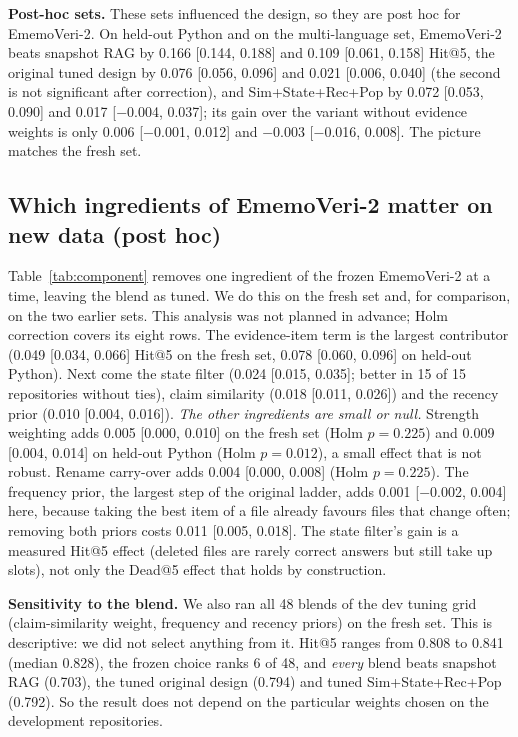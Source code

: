 \documentclass[runningheads]{llncs}
\newcommand{\sys}{EmemoVeri}
\begin{document}
\textbf{Post-hoc sets.} These sets influenced the design, so they are post hoc for \sys{}-2. On held-out Python and on the multi-language set, \sys{}-2 beats snapshot RAG by 0.166 [0.144, 0.188] and 0.109 [0.061, 0.158] Hit@5, the original tuned design by 0.076 [0.056, 0.096] and 0.021 [0.006, 0.040] (the second is not significant after correction), and Sim+State+Rec+Pop by 0.072 [0.053, 0.090] and 0.017 [$-$0.004, 0.037]; its gain over the variant without evidence weights is only 0.006 [$-$0.001, 0.012] and $-$0.003 [$-$0.016, 0.008]. The picture matches the fresh set.

\subsection{Which ingredients of \sys{}-2 matter on new data (post hoc)}
\label{sec:component}
Table~\ref{tab:component} removes one ingredient of the frozen \sys{}-2 at a time, leaving the blend as tuned. We do this on the fresh set and, for comparison, on the two earlier sets. This analysis was not planned in advance; Holm correction covers its eight rows. The evidence-item term is the largest contributor (0.049 [0.034, 0.066] Hit@5 on the fresh set, 0.078 [0.060, 0.096] on held-out Python). Next come the state filter (0.024 [0.015, 0.035]; better in 15 of 15 repositories without ties), claim similarity (0.018 [0.011, 0.026]) and the recency prior (0.010 [0.004, 0.016]). \emph{The other ingredients are small or null.} Strength weighting adds 0.005 [0.000, 0.010] on the fresh set (Holm $p=0.225$) and 0.009 [0.004, 0.014] on held-out Python (Holm $p=0.012$), a small effect that is not robust. Rename carry-over adds 0.004 [0.000, 0.008] (Holm $p=0.225$). The frequency prior, the largest step of the original ladder, adds 0.001 [$-$0.002, 0.004] here, because taking the best item of a file already favours files that change often; removing both priors costs 0.011 [0.005, 0.018]. The state filter's gain is a measured Hit@5 effect (deleted files are rarely correct answers but still take up slots), not only the Dead@5 effect that holds by construction.

\textbf{Sensitivity to the blend.} We also ran all 48 blends of the dev tuning grid (claim-similarity weight, frequency and recency priors) on the fresh set. This is descriptive: we did not select anything from it. Hit@5 ranges from 0.808 to 0.841 (median 0.828), the frozen choice ranks 6 of 48, and \emph{every} blend beats snapshot RAG (0.703), the tuned original design (0.794) and tuned Sim+State+Rec+Pop (0.792). So the result does not depend on the particular weights chosen on the development repositories.
\end{document}
